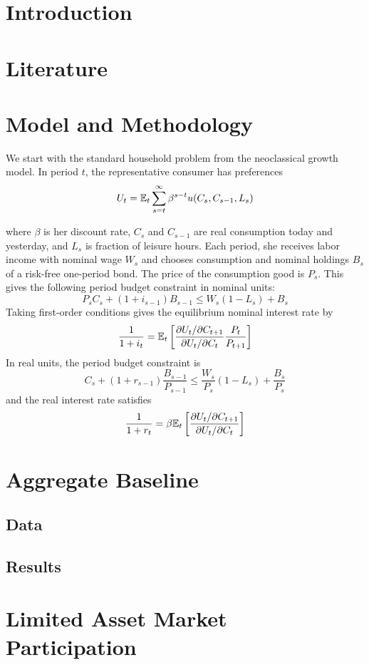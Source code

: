 \documentclass{thesis}
\begin{document}

\tableofcontents \newpage



\section{Introduction}

\section{Literature}

\section{Model and Methodology}
We start with the standard household problem from the neoclassical growth model. In period $t$, the representative consumer has preferences $$U_t = \mathbb{E}_t \sum_{s=t}^\infty \beta^{s-t} u(C_s, C_{s-1}, L_s)$$

 where $\beta$ is her discount rate, $C_s$ and $C_{s-1}$ are real consumption today and yesterday, and $L_s$ is fraction of leisure hours. Each period, she receives labor income with nominal wage $W_s$ and chooses consumption and nominal holdings $B_s$ of a risk-free one-period bond. The price of the consumption good is $P_s$. This gives the following period budget constraint in nominal units: $$P_s C_s + (1 + i_{s-1})B_{s-1} \leq W_s(1 - L_s) + B_s$$
Taking first-order conditions gives the equilibrium nominal interest rate by $$\frac{1}{1 + i_t} = \mathbb{E}_t \left[  \frac{\partial U_t / \partial C_{t+1}}{\partial U_t / \partial C_t} \frac{P_t}{P_{t+1}}  \right]$$
In real units, the period budget constraint is $$C_s + (1 + r_{s-1}) \frac{B_{s-1}}{P_{s-1}} \leq \frac{W_s}{P_s}(1 - L_s) + \frac{B_s}{P_s}$$ and the real interest rate satisfies $$\frac{1}{1 + r_t} = \beta \mathbb{E}_t \left[  \frac{\partial U_t / \partial C_{t+1}}{\partial U_t / \partial C_t}  \right]$$


\section{Aggregate Baseline}
\subsection{Data}
\subsection{Results}

\section{Limited Asset Market Participation}
\end{document}
